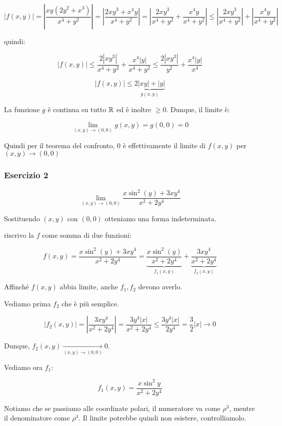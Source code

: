 \[
    \left|f(x,y)\right| =  \left|\frac{xy(2y^{2}+x^{3})}{x^{4}+y^{2}}\right| = \left|\frac{2xy^{3}+x^{4}y}{x^{4}+y^{2}}\right| = \left| \frac{2xy^{3}}{x^{4}+y^{2}}+ \frac{x^{4}y}{x^{4}+y^{2}}\right| \le \left|\frac{2xy^{3}}{x^{4}+y^{2}}\right|+ \left|\frac{x^{4}y}{x^{4}+y^{2}}\right|
\]

quindi:

\[
    |f(x,y)|  \le \frac{2|xy^{3}|}{x^{4}+y^{2}} + \frac{x^{4}|y|}{x^{4}+y^{2}} \le \frac{2|xy^{3}|}{y^{2}} + \frac{x^{4}|y|}{x^{4}}
\]

\[
    |f(x,y)|  \le \underbrace{2 |xy| + |y|}_{g(x,y)}
\]

La funzione \(g\) è continua su tutto \(\mathbb{R} \) ed è inoltre \(\ge 0\). Dunque, il limite è:

\[
    \lim_{ (x,y) \to (0,0) } g(x,y) = g(0,0) = 0
\]

Quindi per il teorema del confronto, 0 è effettivamente il limite di \(f(x,y)\) per \((x,y) \to (0,0)\)

\filbreak{}
\subsubsection*{Esercizio 2}

\[
    \lim_{ (x,y) \to (0,0) } \frac{x\sin^{2}(y)+ 3xy^{4}}{x^{2}+2y^{4}}
\]

Sostituendo \((x,y)\) con \((0,0)\) otteniamo una forma indeterminata.

riscrivo la \(f\) come somma di due funzioni:

\[
    f(x,y) = \frac{x\sin^{2}(y)+ 3xy^{4}}{x^{2}+2y^{4}}  = \underbrace{\frac{x\sin^{2}(y)}{x^{2}+2y^{4}}}_{f_1(x,y)} + \underbrace{\frac{3xy^{4}}{x^{2}+2y^{4}}}_{f_2(x,y)}
\]

Affinché \(f(x,y)\) abbia limite, anche \(f_1, f_2\) devono averlo.

Vediamo prima \(f_2\) che è più semplice.

\[
    |f_2(x,y)| = \left| \frac{3xy^{4}}{x^{2}+2y^{4}}\right| =\frac{3y^{4}|x|}{x^{2}+2y^{4}} \le \frac{3y^{4}|x|}{2y^{4}} = \frac{3}{2}|x| \rightarrow 0
\]

Dunque, \(f_2(x,y) \xrightarrow[(x,y) \to (0,0)]{} 0\).

Vediamo ora \(f_1\):

\[
    f_1(x,y) = \frac{x\sin^{2}y}{x^{2}+2y^{4}}
\]

Notiamo che se passiamo alle coordinate polari, il numeratore va come \(\rho^{3}\), mentre il denominatore come \(\rho^{4}\). Il limite potrebbe quindi non esistere, controlliamolo.

